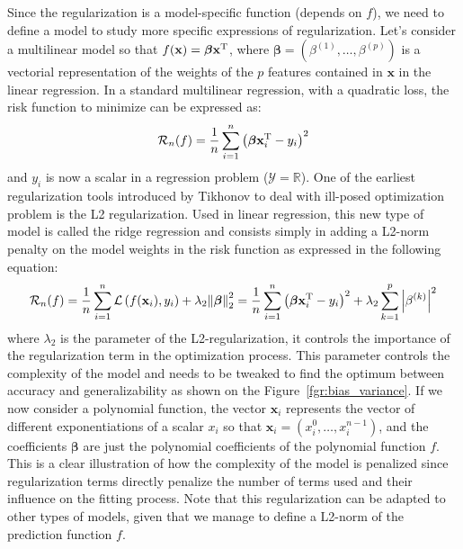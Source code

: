 \documentclass[main]{subfiles}
\begin{document}
Since the regularization is a model-specific function (depends on $f$), we need to define a model to study more specific expressions of regularization. 
Let's consider a multilinear model so that $f(\mathbf{x}) = \boldsymbol{\beta}\mathbf{x}^{\text{T}}$, where $\boldsymbol{\beta}=(\beta^{(1)},\ldots,\beta^{(p)})$ is a vectorial representation of the weights of the $p$ features contained in $\mathbf{x}$ in the linear regression. In a standard multilinear regression, with a quadratic loss, the risk function to minimize can be expressed as:
\begin{equation}\label{eq:linear}
  \mathcal{R}_n(f) = \frac{1}{n}\sum_{i=1}^n {\left(\boldsymbol{\beta}\mathbf{x}_i^{\text{T}}-y_i\right)}^2 
\end{equation}
and $y_i$ is now a scalar in a regression problem ($\mathcal{Y}=\mathbb{R}$). One of the earliest regularization tools introduced by Tikhonov to deal with ill-posed optimization problem is the L2 regularization. Used in linear regression, this new type of model is called the ridge regression and consists simply in adding a L2-norm penalty on the model weights in the risk function as expressed in the following equation:
\begin{equation}\label{eq:L2_reg}
  \mathcal{R}_n(f) = \frac{1}{n}\sum_{i=1}^n \mathcal{L}\left(f(\mathbf{x}_i),y_i\right) + \lambda_2 {\lVert \boldsymbol{\beta} \rVert}_2^2 = \frac{1}{n}\sum_{i=1}^n {\left(\boldsymbol{\beta}\mathbf{x}_i^{\text{T}}-y_i\right)}^2 + \lambda_2 \sum_{k=1}^p \left|\beta^{(k)}\right|^2
\end{equation}
where $\lambda_2$ is the parameter of the L2-regularization, it controls the importance of the regularization term in the optimization process. This parameter controls the complexity of the model and needs to be tweaked to find the optimum between accuracy and generalizability as shown on the Figure~\ref{fgr:bias_variance}. If we now consider a polynomial function, the vector $\mathbf{x}_i$ represents the vector of different exponentiations of a scalar $x_i$ so that $\mathbf{x}_i=\left(x_i^0,\ldots,x_i^{n-1}\right)$, and the coefficients $\boldsymbol{\beta}$ are just the polynomial coefficients of the polynomial function $f$. This is a clear illustration of how the complexity of the model is penalized since regularization terms directly penalize the number of terms used and their influence on the fitting process.
Note that this regularization can be adapted to other types of models, given that we manage to define a L2-norm of the prediction function $f$.
\end{document}
